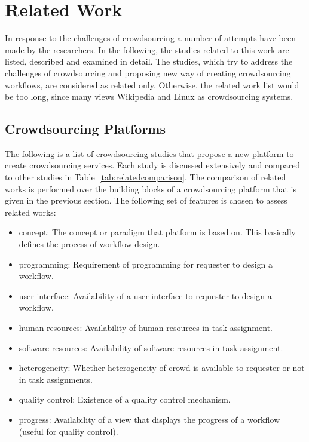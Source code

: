 \chapter{Related Work}
\label{chap:relatedwork}

In response to the challenges of crowdsourcing a number of attempts have been made 
by the researchers. In the following, the studies related to this work are listed, 
described and examined in detail. The studies, which try to address the challenges of 
crowdsourcing and proposing new way of creating crowdsourcing workflows, are
considered as related only. Otherwise, the related work list would be too long, 
since many views Wikipedia and Linux as crowdsourcing systems.


\section{Crowdsourcing Platforms}
The following is a list of crowdsourcing studies that propose a new platform 
to create crowdsourcing services. Each study is discussed extensively 
and compared to other studies in Table~\ref{tab:relatedcomparison}. 
The comparison of related works is performed over the building blocks of 
a crowdsourcing platform that is given in the previous section. The following 
set of features is chosen to assess related works:
\begin{itemize}
	\item concept: The concept or paradigm that platform is based on. This 
	basically defines the process of workflow design.
	\item programming: Requirement of programming for requester to design a workflow.
	\item user interface: Availability of a user interface to requester to design a workflow. 
	\item human resources: Availability of human resources in task assignment.
	\item software resources: Availability of software resources in task assignment.
	\item heterogeneity: Whether heterogeneity of crowd is available to requester or not
	in task assignments.
	\item quality control: Existence of a quality control mechanism.
	\item progress: Availability of a view that displays the progress of a workflow (useful
	for quality control).
\end{itemize}

